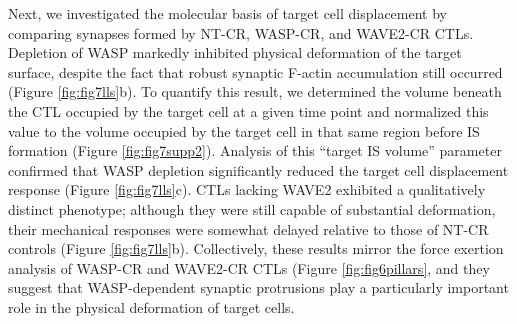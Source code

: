 Next, we investigated the molecular basis of target cell displacement by comparing synapses formed by NT-CR, WASP-CR, and WAVE2-CR CTLs. Depletion of WASP markedly inhibited physical deformation of the target surface, despite the fact that robust synaptic F-actin accumulation still occurred (Figure \ref{fig:fig7lls}b). To quantify this result, we determined the volume beneath the CTL occupied by the target cell at a given time point and normalized this value to the volume occupied by the target cell in that same region before IS formation (Figure \ref{fig:fig7supp2}). Analysis of this “target IS volume” parameter confirmed that WASP depletion significantly reduced the target cell displacement response (Figure \ref{fig:fig7lls}c). CTLs lacking WAVE2 exhibited a qualitatively distinct phenotype; although they were still capable of substantial deformation, their mechanical responses were somewhat delayed relative to those of NT-CR controls (Figure \ref{fig:fig7lls}b). Collectively, these results mirror the force exertion analysis of WASP-CR and WAVE2-CR CTLs (Figure \ref{fig:fig6pillars}, and they suggest that WASP-dependent synaptic protrusions play a particularly important role in the physical deformation of target cells.

